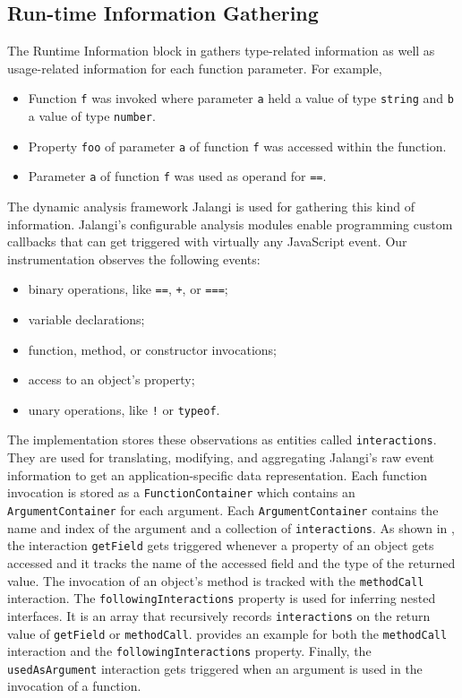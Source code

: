 \documentclass[sigconf]{acmart}
\begin{document}
\subsection{Run-time Information Gathering}
\label{sec:run-time-information}
The Runtime Information block in
 gathers
type-related information as well as usage-related information for each function parameter.
For example,

\begin{itemize}
  \item Function \lstinline{f} was invoked where parameter
    \lstinline{a} held a value of type \lstinline{string} and
    \lstinline{b} a value of type \lstinline{number}. 
  \item Property \lstinline{foo} of parameter \lstinline{a} of
    function \lstinline{f} was accessed within the function. 
  \item Parameter \lstinline{a} of function \lstinline{f} was used as
    operand for \lstinline{==}. 
\end{itemize}

The dynamic analysis framework Jalangi is used for gathering this kind of
information. Jalangi's configurable analysis modules enable
programming custom callbacks that can get triggered with virtually any
JavaScript event. Our instrumentation observes the following events: 
\begin{itemize}
  \item binary operations, like \lstinline{==}, \lstinline{+}, or
    \lstinline{===};
  \item variable declarations;
  \item function, method, or constructor invocations;
  \item access to an object's property;
  \item unary operations, like \lstinline{!} or \lstinline{typeof}.
\end{itemize}

The implementation stores these observations as entities called
\texttt{interactions}. They are used for translating, modifying, and
aggregating Jalangi's raw event information to get an application-specific data representation. Each function invocation is stored as
a \texttt{FunctionContainer} which contains an \texttt{ArgumentContainer} for each argument. Each \texttt{ArgumentContainer} contains 
the name and index of the argument and a collection of \texttt{interactions}. As shown in , the interaction \texttt{getField} gets triggered whenever 
a property of an object gets accessed and it tracks the name of the accessed field and the type of the returned value. The invocation of an object's method is tracked with 
the \texttt{methodCall} interaction. The \texttt{followingInteractions} property is used for inferring nested interfaces.
It is an array that recursively records \texttt{interactions} on the return value of \texttt{getField} or 
\texttt{methodCall}.  provides an example for both the \texttt{methodCall} interaction
and the \texttt{followingInteractions} property. Finally, the \texttt{usedAsArgument} interaction
gets triggered when an argument is used in the invocation of a function.
\end{document}
